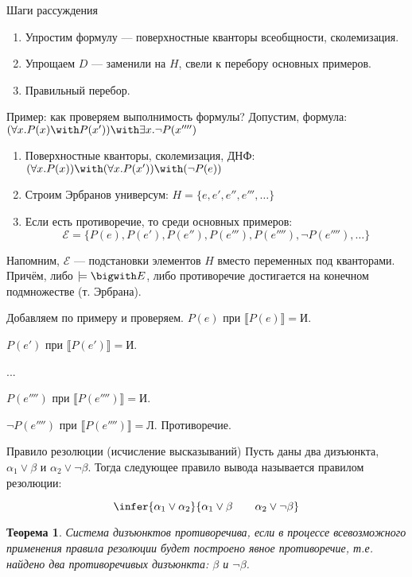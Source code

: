 \documentclass[aspectratio=169]{beamer}
\newtheorem{thm}{Теорема}[section]
\begin{document}
\begin{frame}{Шаги рассуждения}
\begin{enumerate}
\item \color{gray}Упростим формулу --- поверхностные кванторы всеобщности, сколемизация.
\item Упрощаем $D$ --- заменили на $H$, свели к перебору основных примеров.
\item \color{black}Правильный перебор.
\end{enumerate}
\end{frame}

\begin{frame}{Пример: как проверяем выполнимость формулы?}
Допустим, формула: $(\forall x.P(x)\with P(x')) \with \exists x.\neg P(x'''')$

\begin{enumerate}
\item Поверхностные кванторы, сколемизация, ДНФ: $(\forall x.P(x)) \with (\forall x.P(x')) \with (\neg P(e))$
\item Строим Эрбранов универсум: $H = \{e, e', e'', e''', \dots \}$
\item Если есть противоречие, то среди основных примеров:
$$\mathcal{E} = \{ P(e), P(e'), P(e''), P(e'''), P(e''''), \neg P(e''''), \dots \}$$
\end{enumerate}

Напомним, $\mathcal{E}$ --- подстановки элементов $H$ вместо переменных под кванторами.
Причём, либо $\models\bigwith E$, либо противоречие достигается на конечном подмножестве (т. Эрбрана).

Добавляем по примеру и проверяем.
$P(e)$ при $\llbracket P(e) \rrbracket  = \text{И}$.

$P(e')$ при $\llbracket P(e') \rrbracket = \text{И}$.

...

$P(e'''')$ при $\llbracket P(e'''') \rrbracket = \text{И}$.

$\neg P(e'''')$ при $\llbracket P(e'''') \rrbracket = \text{Л}$. Противоречие.

\end{frame}

\begin{frame}{Правило резолюции (исчисление высказываний)}
Пусть даны два дизъюнкта, $\alpha_1 \vee \beta$ и $\alpha_2 \vee \neg \beta$.
Тогда следующее правило вывода называется правилом резолюции:

$$\infer{\alpha_1\vee \alpha_2}{\alpha_1\vee \beta\quad\quad \alpha_2\vee\neg \beta}$$

\begin{thm}Система дизъюнктов противоречива, если в процессе всевозможного применения
правила резолюции будет построено явное противоречие,
т.е. найдено два противоречивых дизъюнкта: $\beta$ и $\neg\beta$.
\end{thm}
\end{frame}
\end{document}
